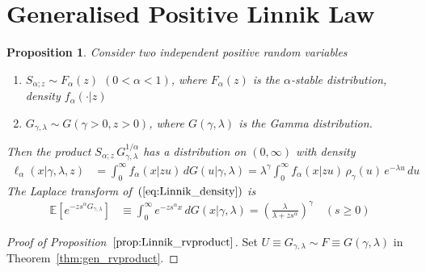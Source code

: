 \documentclass[a4paper,12pt]{article}
\newtheorem{proposition}{Proposition}
\begin{document}
{{\section{Generalised Positive Linnik Law}
\label{sec:Linnik}

 \begin{proposition}
\label{prop:Linnik_rvproduct}
Consider two  independent positive random variables
\begin{enumerate}
\setlength{\itemsep}{0pt}
\item $S_{\alpha;z} \sim F_\alpha(z)$ $(0<\alpha<1)$,  where $F_\alpha(z)$ is  the  
$\alpha$-stable distribution, density $f_\alpha(\cdot\vert z)$ 
\item $G_{\gamma, \lambda}\sim G(\gamma>0, z>0)$, where  $G(\gamma, \lambda)$ is the   Gamma distribution. 
\end{enumerate}

Then the product $S_{\alpha;z}\, G_{\gamma, \lambda}^{1/\alpha}$ has a distribution  on  $(0,\infty)$ %
with density
\begin{align}
\ell_\alpha(x\vert \gamma, \lambda,z) &= \int_0^\infty f_\alpha(x\vert  zu) \, dG(u\vert \gamma, \lambda)
= \lambda^\gamma \int_0^\infty f_\alpha(x\vert  zu) \,  \rho_\gamma(u) \, e^{-\lambda u} \, du
\label{eq:Linnik_density}
\end{align}
The Laplace transform %
of~$(\ref{eq:Linnik_density})$ is %
\begin{align}
 \mathbb{E}\left[e^{-zs^\alpha G_{\gamma, \lambda}}\right]   
&\equiv \int_0^\infty e^{- zs^\alpha x} \,  dG(x\vert \gamma, \lambda)
= \left(\frac{\lambda}{\lambda+  zs^\alpha}\right)^\gamma \quad (s\ge 0)
\label{eq:Linnik_densityLT}
\end{align}
 \end{proposition}
\begin{proof} [Proof of Proposition~$\ref{prop:Linnik_rvproduct}$]
\label{proof:Linnik_rvproduct}
Set  $U\equiv G_{\gamma, \lambda}\sim F \equiv G(\gamma, \lambda)$ in Theorem~\ref{thm:gen_rvproduct}.
\end{proof}

}}
\end{document}
